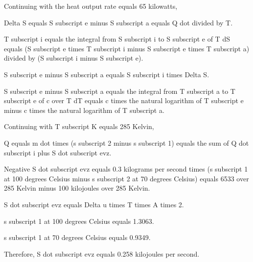 Continuing with the heat output rate equals 65 kilowatts,

Delta S equals S subscript e minus S subscript a equals Q dot divided by T.

T subscript i equals the integral from S subscript i to S subscript e of T dS equals (S subscript e times T subscript i minus S subscript e times T subscript a) divided by (S subscript i minus S subscript e).

S subscript e minus S subscript a equals S subscript i times Delta S.

S subscript e minus S subscript a equals the integral from T subscript a to T subscript e of c over T dT equals c times the natural logarithm of T subscript e minus c times the natural logarithm of T subscript a.

Continuing with T subscript K equals 285 Kelvin,

Q equals m dot times (s subscript 2 minus s subscript 1) equals the sum of Q dot subscript i plus S dot subscript evz.

Negative S dot subscript evz equals 0.3 kilograms per second times (s subscript 1 at 100 degrees Celsius minus s subscript 2 at 70 degrees Celsius) equals 6533 over 285 Kelvin minus 100 kilojoules over 285 Kelvin.

S dot subscript evz equals Delta u times T times A times 2.

s subscript 1 at 100 degrees Celsius equals 1.3063.

s subscript 1 at 70 degrees Celsius equals 0.9349.

Therefore, S dot subscript evz equals 0.258 kilojoules per second.